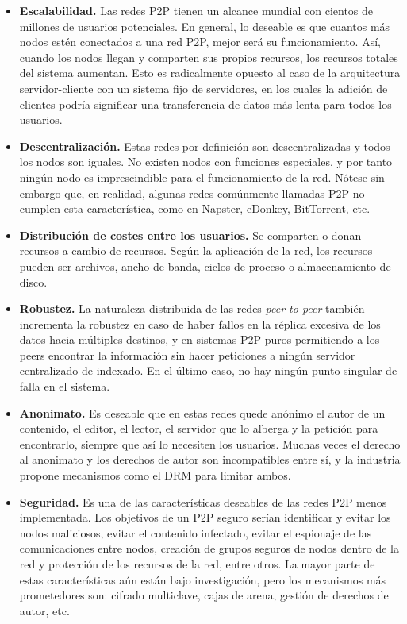 \documentclass[10pt, a4paper]{article}
\theoremstyle{theorem-style}
\theoremstyle{theorem-style}
\theoremstyle{definition-style}
\theoremstyle{remark-style}
\theoremstyle{example-style}
\theoremstyle{definition-style}
\theoremstyle{remark-style}
\begin{document}
\begin{itemize}
\def\labelenumi{\arabic{enumi}.}
\itemsep1pt\parskip0pt
\item
  \textbf{Escalabilidad.} Las redes P2P tienen un alcance mundial con cientos de
millones de usuarios potenciales. En general, lo deseable es que cuantos
más nodos estén conectados a una red P2P, mejor será su funcionamiento.
Así, cuando los nodos llegan y comparten sus propios recursos, los recursos totales del sistema aumentan. Esto es radicalmente opuesto al caso de la arquitectura servidor-cliente con un sistema fijo de servidores, en los cuales la adición de clientes podría significar una transferencia de datos más lenta para todos los usuarios.
\item
  \textbf{Descentralización.} Estas redes por definición son descentralizadas y
todos los nodos son iguales. No existen nodos con funciones especiales, y
por tanto ningún nodo es imprescindible para el funcionamiento de la red.
Nótese sin embargo que, en realidad, algunas redes comúnmente llamadas P2P no cumplen esta
característica, como en Napster, eDonkey, BitTorrent, etc.
\item
  \textbf{Distribución de costes entre los usuarios.} Se comparten o donan
recursos a cambio de recursos. Según la aplicación de la red, los recursos
pueden ser archivos, ancho de banda, ciclos de proceso o almacenamiento
de disco.
\item
	\textbf{Robustez.} La naturaleza distribuida de las redes \emph{peer-to-peer} también
incrementa la robustez en caso de haber fallos en la réplica excesiva de
los datos hacia múltiples destinos, y en sistemas P2P puros permitiendo a
los peers encontrar la información sin hacer peticiones a ningún servidor
centralizado de indexado. En el último caso, no hay ningún punto
singular de falla en el sistema.
\item
	\textbf{Anonimato.} Es deseable que en estas redes quede anónimo el autor de un
contenido, el editor, el lector, el servidor que lo alberga y la petición para
encontrarlo, siempre que así lo necesiten los usuarios. Muchas veces el
derecho al anonimato y los derechos de autor son incompatibles entre sí,
y la industria propone mecanismos como el DRM para limitar ambos.
\item
	\textbf{Seguridad.} Es una de las características deseables de las redes P2P
menos implementada. Los objetivos de un P2P seguro serían identificar y
evitar los nodos maliciosos, evitar el contenido infectado, evitar el
espionaje de las comunicaciones entre nodos, creación de grupos seguros
de nodos dentro de la red y protección de los recursos de la red, entre otros. La
mayor parte de estas características aún están bajo investigación, pero los
mecanismos más prometedores son: cifrado multiclave, cajas de arena,
gestión de derechos de autor, etc.
\end{itemize}
\end{document}

